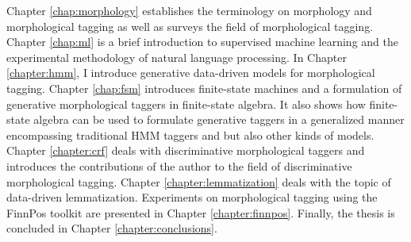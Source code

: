 Chapter \ref{chap:morphology} establishes the terminology on
morphology and morphological tagging as well as surveys the field of
morphological tagging.  Chapter \ref{chap:ml} is a brief introduction
to supervised machine learning and the experimental methodology of
natural language processing.  In Chapter \ref{chapter:hmm}, I
introduce generative data-driven models for morphological tagging.
Chapter \ref{chap:fsm} introduces finite-state machines and a
formulation of generative morphological taggers in finite-state
algebra. It also shows how finite-state algebra can be used to
formulate generative taggers in a generalized manner encompassing
traditional HMM taggers and but also other kinds of models.  Chapter
\ref{chapter:crf} deals with discriminative morphological taggers and
introduces the contributions of the author to the field of
discriminative morphological tagging.  Chapter
\ref{chapter:lemmatization} deals with the topic of data-driven
lemmatization. Experiments on morphological tagging using the FinnPos
toolkit are presented in Chapter \ref{chapter:finnpos}. Finally, the
thesis is concluded in Chapter \ref{chapter:conclusions}.
